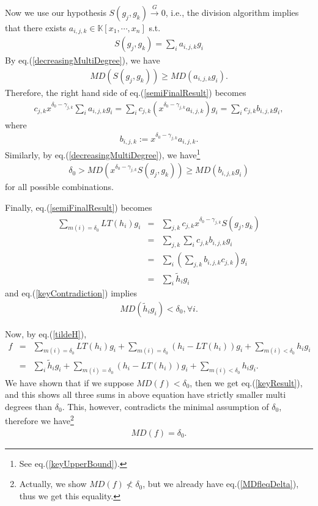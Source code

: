 \documentclass[11pt]{book}
\begin{document}
Now we use our hypothesis $S(g_j, g_k) \stackrel{G}{\to} 0$, i.e., the division algorithm implies that there exists $a_{i,j,k} \in \mathbb{K}[x_1, \cdots, x_n]$ s.t.
\begin{eqnarray}
\label{SpolWithGenerators}
S(g_j, g_k) = \sum_{i} a_{i,j,k} g_i
\end{eqnarray}
By eq.(\ref{decreasingMultiDegree}), we have
\begin{eqnarray}
\label{MDSgeqAG}
MD\left(S(g_j, g_k) \right) \geq MD( a_{i,j,k} g_i).
\end{eqnarray}
Therefore, the right hand side of eq.(\ref{semiFinalResult}) becomes
\begin{eqnarray}
c_{j,k} x^{\delta_0 - \gamma_{j,k}} \sum_{i} a_{i,j,k} g_i = \sum_i c_{j,k} (x^{\delta_0 - \gamma_{j,k}} a_{i,j,k}) g_i
= \sum_{i} c_{j,k} b_{i,j,k} g_i,
\end{eqnarray}
where
\begin{eqnarray}
b_{i,j,k} := x^{\delta_0 - \gamma_{j,k}} a_{i,j,k}.
\end{eqnarray}
Similarly, by eq.(\ref{decreasingMultiDegree}), we have\footnote{See eq.(\ref{keyUpperBound}).}
\begin{eqnarray}
\label{keyContradiction}
\delta_0 > MD \left( x^{\delta_0 - \gamma_{j,k}} S(g_j, g_k) \right) \geq MD( b_{i,j,k} g_i)
\end{eqnarray}
for all possible combinations.

Finally, eq.(\ref{semiFinalResult}) becomes
\begin{eqnarray}
\nonumber
\sum_{m(i) = \delta_0} LT(h_i) g_i &=& \sum_{j,k}c_{j,k} x^{\delta_0 - \gamma_{j,k}} S(g_j, g_k) \\
\nonumber
&=& \sum_{j,k} \sum_{i} c_{j,k} b_{i,j,k} g_i \\
&=& \sum_{i} \left( \sum_{j,k} b_{i,j,k} c_{j,k} \right) g_i \\
\label{tildeH}
&=& \sum_{i} \tilde{h}_i g_i 
\end{eqnarray}
and eq.(\ref{keyContradiction}) implies
\begin{eqnarray}
\label{keyResult}
MD(\tilde{h}_i g_i) < \delta_0, \forall i.
\end{eqnarray}

Now, by eq.(\ref{tildeH}),
\begin{eqnarray}
\nonumber
f &=& \sum_{m(i) = \delta_0} LT(h_i) g_i + \sum_{m(i) = \delta_0} \left(h_i - LT(h_i) \right) g_i + \sum_{m(i) < \delta_0} h_i g_i \\
&=& \sum_{i} \tilde{h}_i g_i  + \sum_{m(i) = \delta_0} \left(h_i - LT(h_i) \right) g_i + \sum_{m(i) < \delta_0} h_i g_i.
\end{eqnarray}
We have shown that if we suppose $MD(f) < \delta_0$, then we get eq.(\ref{keyResult}), and this shows all three sums in above equation have strictly smaller multi degrees than $\delta_0$.
This, however, contradicts the minimal assumption of $\delta_0$, therefore we have\footnote{Actually, we show $MD(f) \nless \delta_0$, but we already have eq.(\ref{MDfleqDelta}), thus we get this equality.}
\begin{eqnarray}
\label{equality}
MD(f) = \delta_0.
\end{eqnarray}
\end{document}
